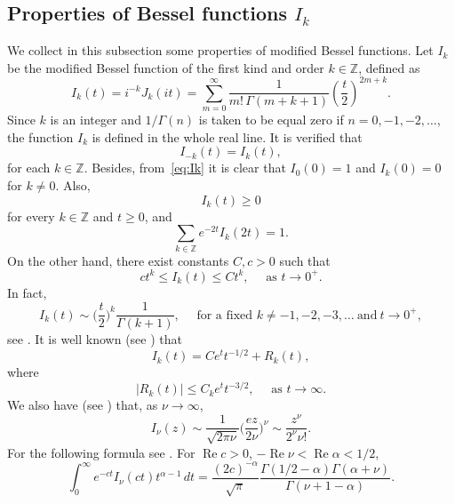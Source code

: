 \documentclass[a4paper,11pt,reqno]{amsart}
\newcommand{\Z}{\mathbb{Z}}
\renewcommand{\Re}{\operatorname{Re}}
\theoremstyle{definition}
\numberwithin{equation}{section}
\begin{document}
\subsection{Properties of Bessel functions $I_k$}
\label{sec:preliminaries}

We collect in this subsection some properties of modified Bessel functions.
Let $I_k$ be the modified Bessel function of the first kind and order $k\in \Z$, defined as
\begin{equation}
\label{eq:Ik}
I_k(t) = i^{-k} J_k(it) = \sum_{m=0}^{\infty} \frac{1}{m!\,\Gamma(m+k+1)} \left(\frac{t}{2}\right)^{2m+k}.
\end{equation}
Since $k$ is an integer and $1/\Gamma(n)$ is taken to be equal zero if $n=0,-1,-2,\ldots$, the function $I_k$ is defined in the whole real line.
It is verified that
\begin{equation}
\label{eq:negPos}
I_{-k}(t) = I_k(t),
\end{equation}
for each $k \in \Z$. Besides, from~\eqref{eq:Ik} it is clear that
$I_0(0) = 1$ and $I_k(0) = 0$ for $k \ne 0$.
Also,
\begin{equation}
\label{eq:Ik>0}
I_k(t) \ge 0
\end{equation}
for every $k \in \Z$ and $t\ge0$, and
\begin{equation}
\label{eq:sumIk}
\sum_{k \in \Z} e^{-2t} I_k(2t) = 1.
\end{equation}
On the other hand, there exist constants $C,c>0$ such that
$$
c t^k\le I_k(t)\le C t^k, \quad \text{ as } t\to0^+.
$$
In fact,
\begin{equation}
\label{eq:asymptotics-zero-ctes}
I_k(t)\sim \bigg(\frac{t}{2}\bigg)^k\frac{1}{\Gamma(k+1)}, \quad \text{ for a fixed } 
k\neq -1,-2,-3,\ldots~\text{and}~t\to0^+,
\end{equation}
see \cite{OlMax}.
It is well known (see \cite{Lebedev}) that
\begin{equation}
\label{eq:asymptotics-infinite}
I_k(t)=C e^t t^{-1/2}+ R_k(t),
\end{equation}
where
\[
|R_k(t)|\le C_k e^tt^{-3/2}, \quad \text{ as } t\to\infty.
\]
We also have (see \cite{OlMax}) that, as $\nu\to \infty$,
\begin{equation}
\label{eq:asymptotics-order-large}
I_{\nu}(z)\sim \frac{1}{\sqrt{2\pi \nu}}\bigg(\frac{e z}{2 \nu}\bigg)^{\nu}\sim \frac{z^\nu}{2^{\nu} \nu!}.
\end{equation}
For the following formula see \cite[p.~305]{Prudnikov2}. For $\Re c>0$, $-\Re \nu<\Re \alpha<1/2$,
\begin{equation}
\label{eq:rusos}
\int_0^{\infty} e^{-ct} I_{\nu}(ct) t^{\alpha-1}\,dt
= \frac{(2c)^{-\alpha}}{\sqrt{\pi}} \frac{\Gamma(1/2-\alpha)\Gamma(\alpha+\nu)
}{\Gamma(\nu+1-\alpha)}.
\end{equation}
\end{document}
